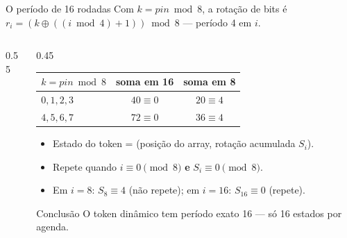 \documentclass[aspectratio=169]{beamer}
\begin{document}
\begin{frame}{O período de 16 rodadas}
  Com $k = pin \bmod 8$, a rotação de bits é
  $r_i = (k \oplus ((i \bmod 4)+1)) \bmod 8$ --- \alert{período 4 em $i$}.
  \begin{columns}[T]
    \begin{column}{0.55\textwidth}
      \begin{center}
      \end{center}
    \end{column}
    \begin{column}{0.45\textwidth}
      \begin{tabular}{@{}l c c@{}}
        $k = pin \bmod 8$ & soma em 16 & soma em 8\\
        \hline
        $0,1,2,3$ & $40 \equiv 0$ & $20 \equiv 4$\\
        $4,5,6,7$ & $72 \equiv 0$ & $36 \equiv 4$\\
      \end{tabular}
      \vspace{0.2em}
      \begin{itemize}
        \item Estado do token = (posição do array, rotação acumulada $S_i$).
        \item Repete quando $i\equiv0 \pmod 8$ \textbf{e} $S_i\equiv0 \pmod 8$.
        \item Em $i=8$: $S_8\equiv4$ (\alert{não} repete); em $i=16$:
              $S_{16}\equiv0$ (\alert{repete}).
      \end{itemize}
      \begin{block}{Conclusão}
        O token dinâmico tem \alert{período exato 16} --- só 16 estados por agenda.
      \end{block}
    \end{column}
  \end{columns}
\end{frame}
\end{document}
